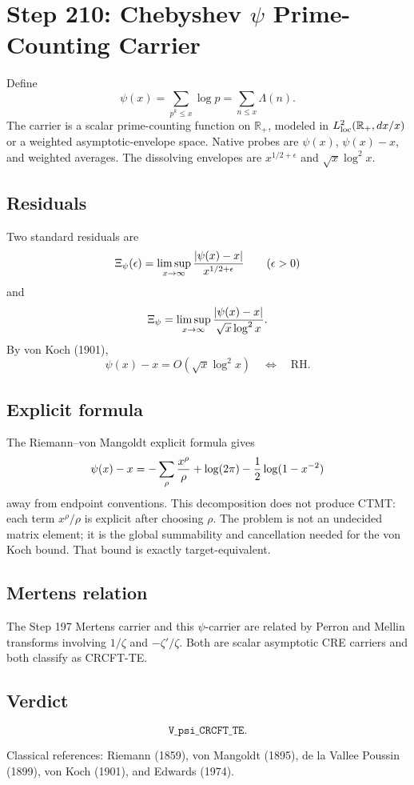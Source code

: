 \documentclass[11pt]{article}
\begin{document}
\section*{Step 210: Chebyshev \(\psi\) Prime-Counting Carrier}

Define
\[
  \psi(x)=\sum_{p^k\le x}\log p=\sum_{n\le x}\Lambda(n).
\]
The carrier is a scalar prime-counting function on \(\mathbb R_+\), modeled in
\(L^2_{\rm loc}(\mathbb R_+,dx/x)\) or a weighted asymptotic-envelope space.
Native probes are \(\psi(x)\), \(\psi(x)-x\), and weighted averages.  The
dissolving envelopes are \(x^{1/2+\epsilon}\) and
\(\sqrt{x}\log^2x\).

\subsection*{Residuals}

Two standard residuals are
\[
  \Xi_\psi(\epsilon)=\limsup_{x\to\infty}
  {|\psi(x)-x|\over x^{1/2+\epsilon}}
  \qquad(\epsilon>0)
\]
and
\[
  \Xi_\psi=\limsup_{x\to\infty}
  {|\psi(x)-x|\over \sqrt{x}\log^2x}.
\]
By von Koch (1901),
\[
  \psi(x)-x=O(\sqrt{x}\log^2x)
  \quad\Longleftrightarrow\quad \mathrm{RH}.
\]

\subsection*{Explicit formula}

The Riemann--von Mangoldt explicit formula gives
\[
  \psi(x)-x=-\sum_\rho {x^\rho\over\rho}
  +\log(2\pi)-{1\over2}\log(1-x^{-2})
\]
away from endpoint conventions.  This decomposition does not produce CTMT:
each term \(x^\rho/\rho\) is explicit after choosing \(\rho\).  The problem is
not an undecided matrix element; it is the global summability and cancellation
needed for the von Koch bound.  That bound is exactly target-equivalent.

\subsection*{Mertens relation}

The Step 197 Mertens carrier and this \(\psi\)-carrier are related by Perron
and Mellin transforms involving \(1/\zeta\) and \(-\zeta'/\zeta\).  Both are
scalar asymptotic CRE carriers and both classify as CRCFT-TE.

\subsection*{Verdict}

\[
  \boxed{\texttt{V\_psi\_CRCFT\_TE}.}
\]

Classical references: Riemann (1859), von Mangoldt (1895), de la Vallee
Poussin (1899), von Koch (1901), and Edwards (1974).
\end{document}
